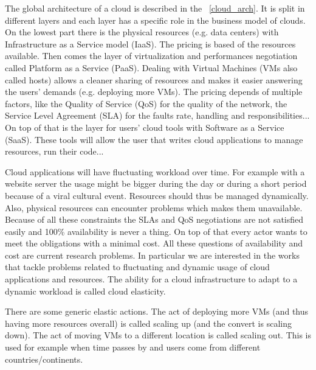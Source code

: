 \documentclass[a4paper, onecolumn]{article}
\begin{document}
  The global architecture of a cloud is described in the
  \figurename~\ref{cloud_arch}. It is split in different layers and each layer
  has a specific role in the business model of clouds. On the lowest part there
  is the physical resources (e.g. data centers) with Infrastructure as a Service
  model (IaaS). The pricing is based of the resources available. Then comes the
  layer of virtualization and performances negotiation called Platform as a
  Service (PaaS). Dealing with Virtual Machines (VMs also called hosts) allows a
  cleaner sharing of resources and makes it easier answering the users' demands
  (e.g. deploying more VMs). The pricing depends of multiple factors, like the
  Quality of Service (QoS) for the quality of the network, the Service Level
  Agreement (SLA) for the faults rate, handling and responsibilities... On top
  of that is the layer for users' cloud tools with Software as a Service (SaaS).
  These tools will allow the user that writes cloud applications to manage
  resources, run their code...
  
  Cloud applications will have fluctuating workload over time. For example 
  with a website server the usage might be bigger during the day or during a 
  short period because of a viral cultural event. Resources should thus be 
  managed dynamically. Also, physical resources can encounter problems which 
  makes them unavailable. Because of all these constraints the SLAs and QoS 
  negotiations are not satisfied easily and 100\% availability is never a 
  thing. 
  On top of that every actor wants to meet the obligations with a minimal cost. 
  All these questions of availability and cost are current research problems. 
  In particular we are interested in the works that tackle problems related to 
  fluctuating and dynamic usage of cloud applications and resources. The 
  ability for a cloud infrastructure to adapt to a dynamic workload is called 
  cloud elasticity.
  
  
  There are some generic elastic actions. The act of deploying more VMs (and
  thus having more resources overall) is called scaling up (and the convert is
  scaling down). The act of moving VMs to a different location is called scaling
  out. This is used for example when time passes by and users come from
  different countries/continents.
  
  
\end{document}
